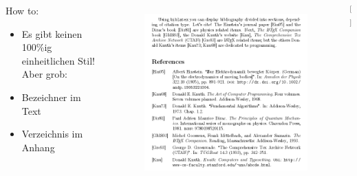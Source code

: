 \documentclass["WS\space 16-17\space -\space LaTeX-Kurs\space -\space Praesentation\space -\space 3.tex"]{subfiles}
\begin{document}
\begin{frame}[c]

  \begin{columns}[c]
    \begin{block}{How to:}
      \begin{itemize}
      \item Es gibt keinen 100\%ig einheitlichen Stil! Aber grob:
      \item Bezeichner im Text
      \item Verzeichnis im Anhang
      \end{itemize}
    \end{block}
    
    \begin{figure}
      \centering
      \includegraphics[width=\linewidth]{img/BiblatexExample.png}
      \label{fig:BiblatexExample}
    \end{figure}
    $^[$\footnotemark$^]$ %
  \end{columns}
  
\end{frame}


\subsection{}
\end{document}

